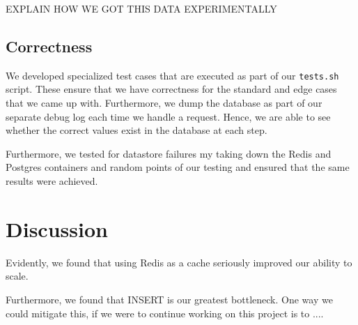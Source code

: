 \documentclass[titlepage, 11pt]{article}
\newcommand\0{\mathbf{0}}
\newcommand\<{\langle}
\renewcommand\>{\rangle}
\begin{document}
EXPLAIN HOW WE GOT THIS DATA EXPERIMENTALLY

\subsection{Correctness}

We developed specialized test cases that are executed as part of our \texttt{tests.sh} script. These ensure that we have correctness for the standard and edge cases that we came up with. Furthermore, we dump the database as part of our separate debug log each time we handle a request. Hence, we are able to see whether the correct values exist in the database at each step. 

Furthermore, we tested for datastore failures my taking down the Redis and Postgres containers and random points of our testing and ensured that the same results were achieved. 

\section{Discussion}

Evidently, we found that using Redis as a cache seriously improved our ability to scale. 

Furthermore, we found that INSERT is our greatest bottleneck. One way we could mitigate this, if we were to continue working on this project is to .... 
\end{document}
